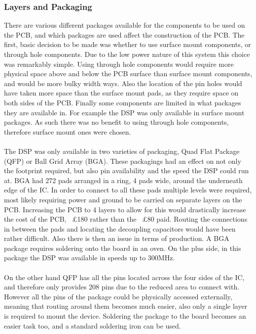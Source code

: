 \subsubsection{Layers and Packaging}
There are various different packages available for the components to be used on the PCB, and which packages are used affect the construction of the PCB.
The first, basic decision to be made was whether to use surface mount components, or through hole components.
Due to the low power nature of this system this choice was remarkably simple.
Using through hole components would require more physical space above and below the PCB surface than surface mount components, and would be more bulky width ways.
Also the location of the pin holes would have taken more space than the surface mount pads, as they require space on both sides of the PCB.
Finally some components are limited in what packages they are available in.
For example the DSP was only available in surface mount packages.
As such there was no benefit to using through hole components, therefore surface mount ones were chosen.
\\
\\
The DSP was only available in two varieties of packaging, Quad Flat Package (QFP) or Ball Grid Array (BGA).
These packagings had an effect on not only the footprint required, but also pin availability and the speed the DSP could run at.
BGA had 272 pads arranged in a ring, 4 pads wide, around the underneath edge of the IC.
In order to connect to all these pads multiple levels were required, most likely requiring power and ground to be carried on separate layers on the PCB.
Increasing the PCB to 4 layers to allow for this would drastically increase the cost of the PCB, ~\pounds180 rather than the ~\pounds80 paid.
Routing the connections in between the pads and locating the decoupling capacitors would have been rather difficult.
Also there is then an issue in terms of production.
A BGA package requires soldering onto the board in an oven.
On the plus side, in this package the DSP was available in speeds up to 300MHz.
\\
\\
On the other hand QFP has all the pins located across the four sides of the IC, and therefore only provides 208 pins due to the reduced area to connect with.
However all the pins of the package could be physically accessed externally, meaning that routing around them becomes much easier, also only a single layer is required to mount the device.
Soldering the package to the board becomes an easier task too, and a standard soldering iron can be used.
